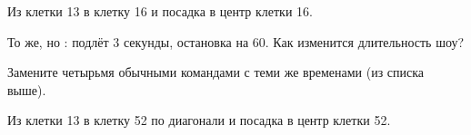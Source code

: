 \begin{probuy}
  \item Из клетки 13 в клетку 16 и посадка в центр клетки 16.
  \item То же, но : подлёт 3 секунды, остановка на 60\cm. Как изменится длительность шоу?
  \item Замените  четырьмя обычными командами с теми же временами (из списка выше).
  \item Из клетки 13 в клетку 52 по диагонали и посадка в центр клетки 52.
\end{probuy}
